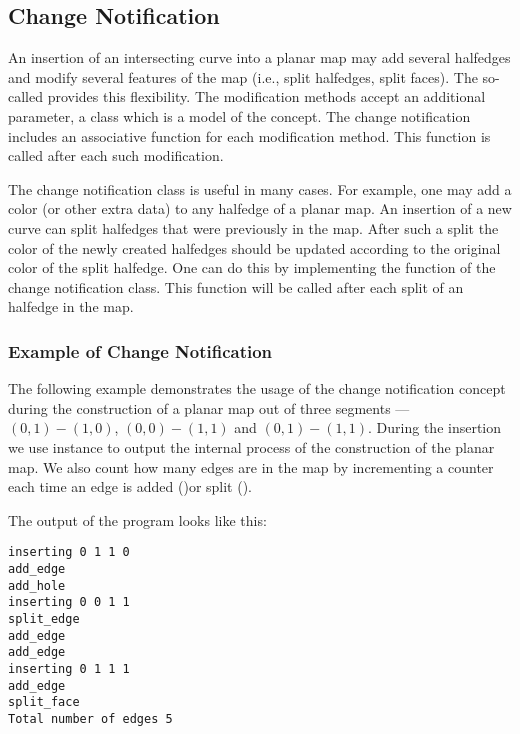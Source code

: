 


\begin{ccAdvanced}
\subsection{Change Notification}
  An insertion of an intersecting curve into a planar map may add
  several halfedges and modify several features of the map (i.e.,
  split halfedges, split faces). The so-called  provides this flexibility. The modification methods
  accept an additional parameter, a class which is a model of the
   concept. The
  change notification includes an associative function for each
  modification method.  This function is called after each such
  modification.

  The change notification class is useful in many cases. For example,
  one may add a color (or other extra data) to any halfedge of a
  planar map. An insertion of a new curve can split halfedges that
  were previously in the map. After such a split the color of the
  newly created halfedges should be updated according to the original
  color of the split halfedge. One can do this by implementing the
   function of the change notification class. This
  function will be called after each split of an halfedge in the map.

\subsubsection{Example of Change Notification}
\label{ssecn:example2}
The following example demonstrates the usage of the change
notification concept during the construction of a
planar map out of three segments --- $(0,1)-(1,0)$, $(0,0)-(1,1)$
and $(0,1)-(1,1)$.
During the insertion we use  instance to
output the internal process of the construction of the planar map.
We also count how many edges are in the map by incrementing a
counter each time an edge is added ()or
split ().


The output of the program looks like this:
\begin{verbatim}
inserting 0 1 1 0
add_edge
add_hole
inserting 0 0 1 1
split_edge
add_edge
add_edge
inserting 0 1 1 1
add_edge
split_face
Total number of edges 5
\end{verbatim}

\end{ccAdvanced}

